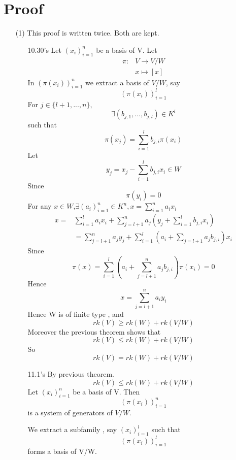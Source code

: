 \documentclass{book}
\begin{document}
\section{Proof}
\begin{itemize}
    \item [(1)]This proof is written twice. Both are kept.
    \begin{itemize}
        \item [10.30's]
            Let $(x_i)_{i=1}^n$ be a basis of V. Let $$\begin{aligned}
            \pi:&V\rightarrow V/W\\&x\mapsto[x]
            \end{aligned}$$
            In $(\pi(x_i))_{i=1}^n$ we extract a basis of $V/W$, say $$(\pi(x_i))_{i=1}^l$$ For $j\in \{l+1,...,n\},$$$\exists (b_{j,1},...,b_{j,l})\in K^l$$ such that $$\pi(x_j)=\sum\limits_{i=1}^lb_{j,i}\pi(x_i)$$
            Let $$y_j=x_j-\sum\limits_{i=1}^lb_{j,i}x_i\in W$$Since $$\pi(y_i)=0$$For any $x\in W$,$\exists(a_i)_{i=1}^n\in K^n,x=\sum\limits_{i=1}^na_ix_i$$$
            \begin{aligned}
            x=&\sum\limits_{i=1}^la_ix_i+\sum\limits_{j=l+1}^na_j(y_j+\sum\limits_{i=1}^lb_{j,i}x_i)\\ 
            &=\sum\limits_{j=l+1}^na_jy_j+\sum\limits_{i=1}^l(a_i+\sum\limits_{j=l+1} a_jb_{j,i})x_i
            \end{aligned}$$
            Since $$\pi(x)=\sum\limits_{i=1}^l(a_i+\sum\limits_{j=l+1}^na_jb_{j,i})\pi(x_i)=0$$Hence $$x=\sum\limits_{j=l+1}^na_iy_i$$
            Hence W is of finite type , and 
            $$rk(V)\geq rk(W)+rk(V/W)$$ 
            Moreover the previous theorem shows that 
            $$rk(V)\leq rk(W)+rk(V/W)$$
            So $$rk(V)= rk(W)+rk(V/W)$$
        \item[11.1's]
            By previous theorem. $$rk(V)\leq rk(W)+rk(V/W)$$
            Let $(x_i)_{i=1}^n$ be a basis of V. Then $$(\pi(x_i))_{i=1}^n$$ is a system of generators of $V/W$.
            
            We extract a subfamily , say $(x_i)_{i=1}^l$ such that $$(\pi(x_i))_{i=1}^l$$ forms a basis of V/W.
        

\end{itemize}
\end{itemize}
\end{document}
